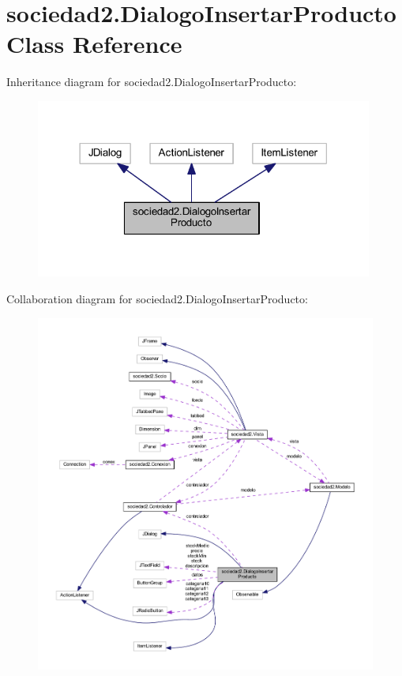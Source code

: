 \hypertarget{classsociedad2_1_1_dialogo_insertar_producto}{}\section{sociedad2.\+Dialogo\+Insertar\+Producto Class Reference}
\label{classsociedad2_1_1_dialogo_insertar_producto}


Inheritance diagram for sociedad2.\+Dialogo\+Insertar\+Producto\+:
\nopagebreak
\begin{figure}[H]
\begin{center}
\leavevmode
\includegraphics[width=314pt]{classsociedad2_1_1_dialogo_insertar_producto__inherit__graph}
\end{center}
\end{figure}


Collaboration diagram for sociedad2.\+Dialogo\+Insertar\+Producto\+:
\nopagebreak
\begin{figure}[H]
\begin{center}
\leavevmode
\includegraphics[width=350pt]{classsociedad2_1_1_dialogo_insertar_producto__coll__graph}
\end{center}
\end{figure}
